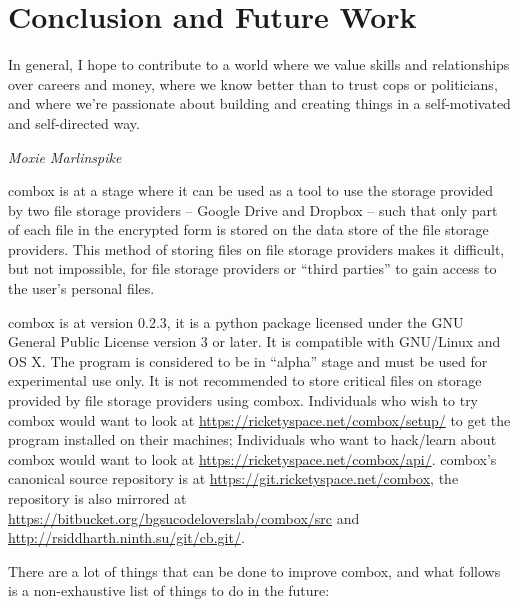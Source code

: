 \chapter{Conclusion and Future Work}\label{ch:5}

\epigraph{In general, I hope to contribute to a world where we value
  skills and relationships over careers and money, where we know
  better than to trust cops or politicians, and where we're passionate
  about building and creating things in a self-motivated and
  self-directed way.}{\textit{Moxie Marlinspike}}

combox is at a stage where it can be used as a tool to use the storage
provided by two file storage providers -- Google Drive and Dropbox --
such that only part of each file in the encrypted form is stored on
the data store of the file storage providers. This method of storing
files on file storage providers makes it difficult, but not impossible,
for file storage providers or ``third parties'' to gain access to the
user's personal files.

combox is at version 0.2.3, it is a python package licensed under the
GNU General Public License version 3 or later. It is compatible with
GNU/Linux and OS X. The program is considered to be in ``alpha'' stage
and must be used for experimental use only. It is not recommended to
store critical files on storage provided by file storage providers
using combox. Individuals who wish to try combox would want to look at
\url{https://ricketyspace.net/combox/setup/} to get the program
installed on their machines; Individuals who want to hack/learn about
combox would want to look at
\url{https://ricketyspace.net/combox/api/}. combox's canonical source
repository is at \url{https://git.ricketyspace.net/combox}, the
repository is also mirrored at
\url{https://bitbucket.org/bgsucodeloverslab/combox/src} and
\url{http://rsiddharth.ninth.su/git/cb.git/}.

There are a lot of things that can be done to improve combox, and what
follows is a non-exhaustive list of things to do in the future:

